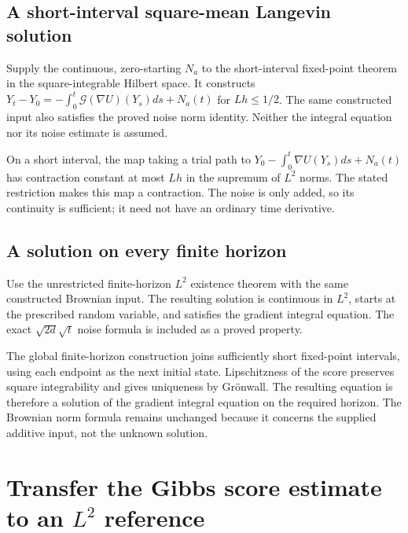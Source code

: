 \documentclass[11pt,a4paper]{article}
\begin{document}
\subsection{\texorpdfstring{A short-interval square-mean Langevin solution}{A short-interval square-mean Langevin solution}}


Supply the continuous, zero-starting \(N_a\) to the short-interval fixed-point theorem in the square-integrable Hilbert space. It constructs \(Y_t-Y_0=-\int_0^t\mathcal G(\nabla U)(Y_s)ds+N_a(t)\) for \(Lh\le1/2\). The same constructed input also satisfies the proved noise norm identity. Neither the integral equation nor its noise estimate is assumed.



On a short interval, the map taking a trial path to \(Y_0-\int_0^t\nabla U(Y_s)ds+N_a(t)\) has contraction constant at most \(Lh\) in the supremum of \(L^2\) norms. The stated restriction makes this map a contraction. The noise is only added, so its continuity is sufficient; it need not have an ordinary time derivative.


\subsection{\texorpdfstring{A solution on every finite horizon}{A solution on every finite horizon}}


Use the unrestricted finite-horizon \(L^2\) existence theorem with the same constructed Brownian input. The resulting solution is continuous in \(L^2\), starts at the prescribed random variable, and satisfies the gradient integral equation. The exact \(\sqrt{2d}\sqrt t\) noise formula is included as a proved property.



The global finite-horizon construction joins sufficiently short fixed-point intervals, using each endpoint as the next initial state. Lipschitzness of the score preserves square integrability and gives uniqueness by Grönwall. The resulting equation is therefore a solution of the gradient integral equation on the required horizon. The Brownian norm formula remains unchanged because it concerns the supplied additive input, not the unknown solution.


\section{\texorpdfstring{Transfer the Gibbs score estimate to an \(L^2\) reference}{Transfer the Gibbs score estimate to an L² reference}}
\end{document}
